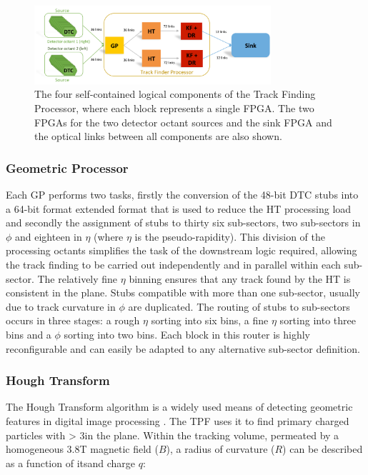 \begin{figure}[!h]
\centering
\includegraphics[width=0.78\textwidth]{figs/tk-upgrade/demoslice1.pdf}
\caption{The four self-contained logical components of the Track Finding Processor, where each block represents a single FPGA. The two FPGAs for the two detector octant sources and the sink FPGA and the optical links between all components are also shown.}
\label{fig:TFP}
\end{figure}

\subsubsection{Geometric Processor}\label{subsubsec:GP}
Each GP performs two tasks, firstly the conversion of the 48-bit DTC stubs into a 64-bit format extended format that is used to reduce the HT processing load and secondly the assignment of stubs to thirty six sub-sectors, two sub-sectors in $\phi$ and eighteen in $\eta$ (where $\eta$ is the pseudo-rapidity). 
This division of the processing octants simplifies the task of the downstream logic required, allowing the track finding to be carried out independently and in parallel within each sub-sector. 
The relatively fine $\eta$ binning ensures that any track found by the \rphi HT is consistent in the \rz plane. Stubs compatible with more than one sub-sector, usually due to track curvature in $\phi$ are duplicated. 
The routing of stubs to sub-sectors occurs in three stages: a rough $\eta$ sorting into six bins, a fine $\eta$ sorting into three bins and a $\phi$ sorting into two bins. 
Each block in this router is highly reconfigurable and can easily be adapted to any alternative sub-sector definition.

\subsubsection{Hough Transform}
The Hough Transform algorithm is a widely used means of detecting geometric features in digital image processing \cite{HT}. 
The TPF uses it to find primary charged particles with \pT > 3\GeV in the \rphi plane. 
Within the tracking volume, permeated by a homogeneous 3.8T magnetic field ($B$), a radius of curvature ($R$) can be described as a function of its\pT and charge $q$:

